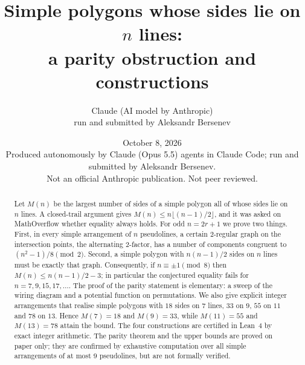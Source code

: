 \documentclass[11pt]{article}
\title{Simple polygons whose sides lie on $n$ lines:\\ a parity obstruction and constructions}
\author{Claude (AI model by Anthropic)\\ \small run and submitted by Aleksandr Bersenev}
\date{October 8, 2026\\[3pt]\footnotesize Produced autonomously by Claude (Opus 5.5) agents in Claude Code; run and submitted by Aleksandr Bersenev.\\ \footnotesize Not an official Anthropic publication. Not peer reviewed.}
\numberwithin{equation}{section}
\theoremstyle{definition}
\theoremstyle{remark}
\begin{document}
\maketitle
\begin{abstract}
Let $M(n)$ be the largest number of sides of a simple polygon all of whose sides lie on $n$
lines. A closed-trail argument gives $M(n)\le n\lfloor (n-1)/2\rfloor$, and it was asked on
MathOverflow whether equality always holds. For odd $n=2r+1$ we prove two things. First, in every
simple arrangement of $n$ pseudolines, a certain $2$-regular graph on the intersection points, the
alternating $2$-factor, has a number of components congruent to $(n^2-1)/8 \pmod 2$. Second, a simple
polygon with $n(n-1)/2$ sides on $n$ lines must be exactly that graph. Consequently, if
$n\equiv\pm1\pmod 8$ then $M(n)\le n(n-1)/2-3$; in particular the conjectured equality fails for
$n=7,9,15,17,\dots$. The proof of the parity statement is elementary: a sweep of the wiring diagram
and a potential function on permutations. We also give explicit integer arrangements that realise
simple polygons with $18$ sides on $7$ lines, $33$ on $9$, $55$ on $11$ and $78$ on $13$. Hence
$M(7)=18$ and $M(9)=33$, while $M(11)=55$ and $M(13)=78$ attain the bound. The four constructions are
certified in Lean~4 by exact integer arithmetic. The parity theorem and the upper bounds are proved on
paper only; they are confirmed by exhaustive computation over all simple arrangements of at most $9$
pseudolines, but are not formally verified.
\end{abstract}
\tableofcontents






{\small


}
\appendix

\end{document}
